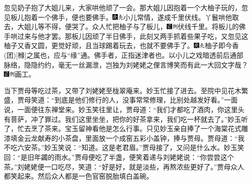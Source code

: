 忽见奶子抱了大姐儿来，大家哄他顽了一会。那大姐儿因抱着一个大柚子玩的，忽见板儿抱着一个佛手，便也要佛手。{\includegraphics[width=3mm]{../Images/00004}\includegraphics[width=3mm]{../Images/00012}\footnotesize \kaishu 小儿常情，遂成千里伏线。}丫鬟哄他取去，大姐儿等不得，便哭了。众人忙把柚子与了板儿，{\includegraphics[width=3mm]{../Images/00006}\includegraphics[width=3mm]{../Images/00011}\footnotesize \kaishu 伏线千里。}将板儿的佛手哄过来与他才罢。那板儿因顽了半日佛手，此刻又两手抓着些果子吃，又忽见这柚子又香又圆，更觉好顽，且当球踢着玩去，也就不要佛手了。{\includegraphics[width=3mm]{../Images/00004}\includegraphics[width=3mm]{../Images/00012}\footnotesize \kaishu 柚子即今香{(团)}{[}橼{]}之属也，应与``缘''通。佛手者，正指迷津者也。以小儿之戏暗透前后通部脉络，隐隐约约，毫无一丝漏泄，岂独为刘姥姥之俚言博笑而有此一大回文字哉？　\includegraphics[width=3mm]{../Images/00006}\includegraphics[width=3mm]{../Images/00011}\footnotesize \kaishu 画工。}

当下贾母等吃过茶，又带了刘姥姥至栊翠庵来。妙玉忙接了进去。至院中见花木繁盛，贾母笑道：``到底是他们修行的人，没事常常修理，比别处越发好看。''一面说，一面便往东禅堂来。妙玉笑往里让，贾母道：``我们才都吃了酒肉，你这里头有菩萨，冲了罪过。我们这里坐坐，把你的好茶拿来，我们吃一杯就去了。''妙玉听了，忙去烹了茶来。宝玉留神看他是怎么行事。只见妙玉亲自捧了一个海棠花式雕漆填金云龙献寿的小茶盘，里面放一个成窑五彩小盖钟，捧与贾母。贾母道：``我不吃六安茶。''妙玉笑说：``知道。这是老君眉。''贾母接了，又问是什么水。妙玉笑回：``是旧年蠲的雨水。''贾母便吃了半盏，便笑着递与刘姥姥说：``你尝尝这个茶。''刘姥姥便一口吃尽，笑道：``好是好，就是淡些，再熬浓些更好了。''贾母众人都笑起来。然后众人都是一色官窑脱胎填白盖碗。


